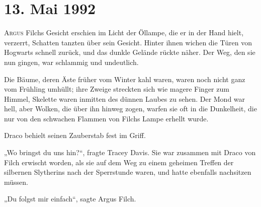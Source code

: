 
\section{13. Mai 1992}

\lettrine{A}{rgus} Filchs Gesicht erschien im Licht der Öllampe, die er in der Hand hielt, verzerrt, Schatten tanzten über sein Gesicht. Hinter ihnen wichen die Türen von Hogwarts schnell zurück, und das dunkle Gelände rückte näher. Der Weg, den sie nun gingen, war schlammig und undeutlich.

Die Bäume, deren Äste früher vom Winter kahl waren, waren noch nicht ganz vom Frühling umhüllt; ihre Zweige streckten sich wie magere Finger zum Himmel, Skelette waren inmitten des dünnen Laubes zu sehen. Der Mond war hell, aber Wolken, die über ihn hinweg zogen, warfen sie oft in die Dunkelheit, die nur von den schwachen Flammen von Filchs Lampe erhellt wurde.

Draco behielt seinen Zauberstab fest im Griff.

„Wo bringst du uns hin?“, fragte Tracey Davis. Sie war zusammen mit Draco von Filch erwischt worden, als sie auf dem Weg zu einem geheimen Treffen der silbernen Slytherins nach der Sperrstunde waren, und hatte ebenfalls nachsitzen müssen.

„Du folgst mir einfach“, sagte Argus Filch.


